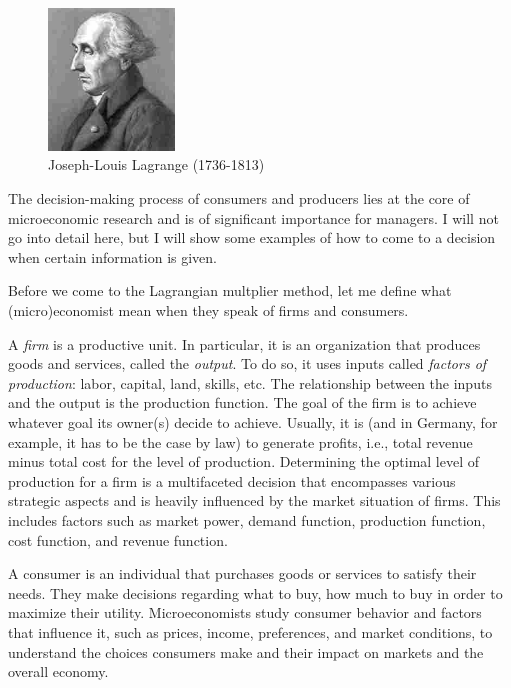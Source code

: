 \documentclass[
  12pt,
  oneside]{book}
\theoremstyle{definition}
\theoremstyle{definition}
\theoremstyle{definition}
\theoremstyle{definition}
\theoremstyle{remark}
\begin{document}
\begin{figure}
\centering
\includegraphics[width=0.3\textwidth,height=\textheight]{fig/Lagrange.jpg}
\caption[\label{fig:Lagrange} Joseph-Louis Lagrange (1736-1813)]{\label{fig:Lagrange} Joseph-Louis Lagrange (1736-1813)\footnotemark{}}
\end{figure}

The decision-making process of consumers and producers lies at the core of microeconomic research and is of significant importance for managers. I will not go into detail here, but I will show some examples of how to come to a decision when certain information is given.

Before we come to the Lagrangian multplier method, let me define what (micro)economist mean when they speak of firms and consumers.

A \emph{firm} is a productive unit. In particular, it is an organization that produces goods and services, called the \emph{output}. To do so, it uses inputs called \emph{factors of production}: labor, capital, land, skills, etc. The relationship between the inputs and the output is the production function. The goal of the firm is to achieve whatever goal its owner(s) decide to achieve. Usually, it is (and in Germany, for example, it has to be the case by law) to generate profits, i.e., total revenue minus total cost for the level of production.
Determining the optimal level of production for a firm is a multifaceted decision that encompasses various strategic aspects and is heavily influenced by the market situation of firms. This includes factors such as market power, demand function, production function, cost function, and revenue function.

A consumer is an individual that purchases goods or services to satisfy their needs. They make decisions regarding what to buy, how much to buy in order to maximize their utility. Microeconomists study consumer behavior and factors that influence it, such as prices, income, preferences, and market conditions, to understand the choices consumers make and their impact on markets and the overall economy.
\end{document}
